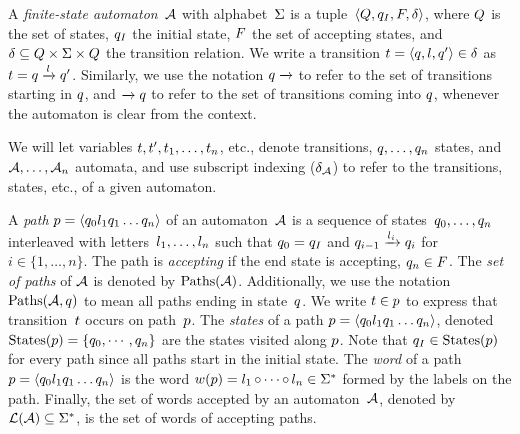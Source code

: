 A \emph{finite-state automaton}~$\mathcal{A}$ with alphabet~$\Sigma$ is a
tuple~$\left\langle Q, q_I, F, \delta\right\rangle$, where $Q$ is the set of states,
$q_I$ the initial state, $F$ the set of
accepting states, and
$\delta \subseteq Q \times \Sigma \times Q$ the
transition relation.  We write a transition
$t = \left\langle q, l, q'\right\rangle \in \delta$ as
$t = q \xrightarrow{l} q'$.  Similarly, we
use the notation $q \xrightarrow{}$ to refer to the set of
transitions starting in $q$, and $\xrightarrow{} q$ to
refer to the set of transitions coming into $q$, whenever the
automaton is clear from the context.

We will let variables $t, t', t_1, \ldots,
t_n$, etc., denote transitions, $q, \ldots, q_n$ states, and
$\mathcal{A}, \ldots, \mathcal{A}_n$ automata, and use subscript indexing
($\delta_{\mathcal{A}}$) to refer to the transitions, states, etc., of a given
automaton.

A \textit{path} $p = \left\langle q_0 l_1 q_1 \ldots q_n\right\rangle$ of an
automaton~$\mathcal{A}$ is a sequence of
states~$q_0, \ldots, q_n$ interleaved with
letters~$l_1, \ldots, l_n$ such that
$q_0 = q_I$ and
$q_{i-1} \xrightarrow{l_{i}} q_{i}$ for
$i \in \{1, \ldots, n\}$.  The path is \emph{accepting} if the end
state is accepting, $q_n \in F$. The \textit{set
  of paths} of $\mathcal{A}$ is denoted by
$\operatorname{Paths}(\mathcal{A})$. Additionally, we use the
notation~$\operatorname{Paths}(\mathcal{A}, q)$ to mean all paths ending in
state~$q$. We write $t \in p$ to express that
transition~$t$ occurs on path~$p$. The \textit{states} of a path
$p = \left\langle q_0 l_1 q_1 \ldots q_n\right\rangle$, denoted
$\operatorname{States}(p) = \left\{q_0, \cdots , q_n\right\}$ are the
states visited along $p$. Note that
$q_I \in \operatorname{States}(p)$ for every path since all paths
start in the initial state.  The \textit{word} of a path
$p = \left\langle q_0 l_1 q_1 \ldots q_n\right\rangle$ is the word
$w(p) = l_1 \operatorname{\circ} \cdots \operatorname{\circ}
 l_n \in \Sigma^*$ formed by the labels on the path. Finally, the
 set of words accepted by an automaton~$\mathcal{A}$, denoted by
 $\operatorname{\mathcal{L}}(\mathcal{A}) \subseteq \Sigma^*$, is the set of words of
 accepting paths.

